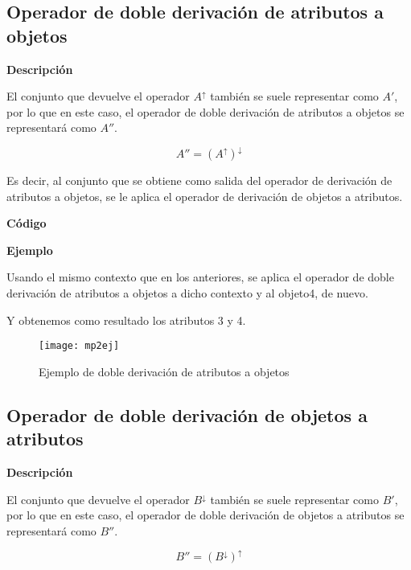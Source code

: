     \subsection{Operador de doble derivaci\'on de atributos a objetos}

        \textbf{Descripci\'on}

        El conjunto que devuelve el operador \( A^\uparrow \) tambi\'en se suele representar como \( A' \), por lo que en este caso, 
        el operador de doble derivaci\'on de atributos a objetos se representar\'a como \( A'' \).


        \[ A'' = (A^\uparrow)^\downarrow \]

        Es decir, al conjunto que se obtiene como salida del operador de derivaci\'on de atributos a objetos, se le aplica el operador 
        de derivaci\'on de objetos a atributos.


        \clearpage

        \textbf{C\'odigo}

        

        \bigskip

        \textbf{Ejemplo}

        Usando el mismo contexto que en los anteriores, se aplica el operador de doble derivaci\'on de atributos a objetos a dicho 
        contexto y al objeto4, de nuevo.

        Y obtenemos como resultado los atributos 3 y 4.

        \begin{figure}[H]
            \centering
            \texttt{[image: mp2ej]}
            \caption{Ejemplo de doble derivaci\'on de atributos a objetos}
            \label{fig:mp2ej}
        \end{figure}



    \subsection{Operador de doble derivaci\'on de objetos a atributos}

        \textbf{Descripci\'on}

        El conjunto que devuelve el operador \( B^\downarrow \) tambi\'en se suele representar como \( B' \), por lo que en este caso, 
        el operador de doble derivaci\'on de objetos a atributos se representar\'a como \( B'' \).


        \[ B'' = (B^\downarrow)^\uparrow \]

